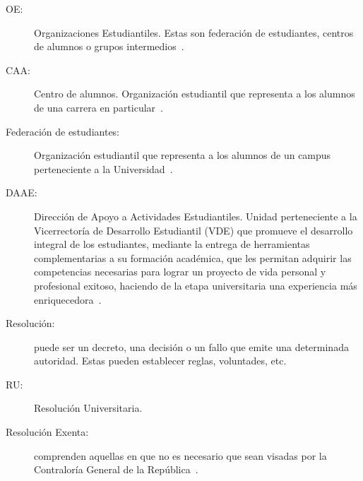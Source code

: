 \begin{glosario}
	\item 	\begin{description}
			    \item[OE:] Organizaciones Estudiantiles. Estas son federación de estudiantes, centros de alumnos o grupos intermedios~\cite{2}.
			\end{description}

	\item 	\begin{description}
			    \item[CAA:] Centro de alumnos. Organización estudiantil que representa a los alumnos de una carrera en particular~\cite{3}.
			\end{description}

	\item 	\begin{description}
			    \item[Federación de estudiantes:] Organización estudiantil que representa a los alumnos de un campus perteneciente a la Universidad~\cite{2}.
			\end{description}

	\item 	\begin{description}
				\item[DAAE:] Dirección de Apoyo a Actividades Estudiantiles. Unidad perteneciente a la Vicerrectoría de Desarrollo Estudiantil (VDE) que promueve el desarrollo integral de los estudiantes, mediante la entrega de herramientas complementarias a su formación académica, que les permitan adquirir las competencias necesarias para lograr un proyecto de vida personal y profesional exitoso, haciendo de la etapa universitaria una experiencia más enriquecedora~\cite{1}.
			\end{description}

	\item 	\begin{description}
			    \item[Resolución:] puede ser un decreto, una decisión o un fallo que emite una determinada autoridad. Estas pueden establecer reglas, voluntades, etc.
			\end{description}
	
	\item 	\begin{description}
				\item[RU:] Resolución Universitaria.
			\end{description}

	\item 	\begin{description}
			    \item[Resolución Exenta:] comprenden aquellas en que no es necesario que sean visadas por la Contraloría General de la República~\cite{3}.
			\end{description}


\end{glosario}
